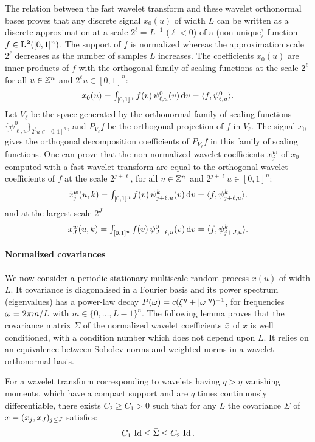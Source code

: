 \documentclass{article}
\begin{document}
The relation between the fast wavelet transform and these wavelet orthonormal
bases proves \cite{mallat1999wavelet} that any discrete signal $x_0 (u)$ of
width $L$ can be written as a discrete approximation at a scale $2^{\ell}=L^{-1}$ ($\ell < 0$) of a 
(non-unique) function $f \in {\bf L^2}([0,1]^n)$. The support of $f$ is normalized whereas the
approximation scale $2^\ell$ decreases as the number of samples $L$ increases. The coefficients $x_0(u)$ are inner
products of $f$ with the orthogonal family of scaling functions at the scale
$2^{\ell}$ for all $u \in \mathbb Z^n$ and $2^{\ell} u \in [0,1]^n$:
\[
  \textstyle{
    x_0 (u) = \int_{[0,1]^n} f(v)\, \psi^0_{\ell,u} (v) \, \mathrm{d}v = {\langle}f , \psi^0_{\ell,u}{\rangle}.
    }
\]
Let $V_{\ell}$ be the space generated by the orthonormal family of scaling functions
$\{ \psi^0_{\ell,u} \}_{2^{\ell} u \in [0,1]^n}$, and  $P_{V_{\ell}} f$ be
the orthogonal projection  of $f$ in $V_{\ell}$.
The signal $x_0$ gives the orthogonal 
decomposition coefficients of  $P_{V_{\ell}} f$ in this
family of scaling functions. One can prove \cite{mallat1999wavelet} that
the non-normalized wavelet coefficients ${\bar x}^w_j$ of $x_0$ computed with a fast
wavelet transform are equal to the orthogonal wavelet coefficients of $f$
at the scale $2^{j+\ell}$, for all $u \in \mathbb Z^n$ and $2^{j+\ell} u \in [0,1]^n$:
\[
  \textstyle{
    {\bar x}_j^w (u,k) = \int_{[0,1]^n} f(v)\, \psi^k_{j+\ell,u} (v) \, \mathrm{d}v = {\langle}f , \psi^k_{j+\ell,u}{\rangle}.
    }
\]
and at the largest scale $2^J$
\[
  \textstyle{
    x_J^w (u,k) = \int_{[0,1]^n} f(v)\, \psi^0_{J+\ell,u} (v) \, \mathrm{d}v = {\langle}f , \psi^k_{j+J,u}{\rangle}.
    }
\]
 

\paragraph{Normalized covariances}
We now consider a periodic stationary multiscale random process $x(u)$ of width $L$.
It covariance is diagonalised in a Fourier basis
and its power spectrum (eigenvalues) has a power-law decay
$P({\omega}) = c (\xi^\eta + |{\omega}|^\eta)^{-1}$, for frequencies ${\omega} = 2 \pi m / L$
with $m \in \{0, \dots, L-1\}^n$.  The following lemma proves that the covariance matrix
$\bar \Sigma$ of the normalized wavelet coefficients ${\bar x}$ of $x$ is well
conditioned, with a condition number which does not depend upon $L$. It relies on an equivalence between Sobolev norms and weighted norms in a wavelet orthonormal basis.

\begin{lemma}
  \label{sec:norm-covar}
  For a wavelet transform corresponding to wavelets having $q > \eta$ vanishing
  moments, which have a compact support and are $q$ times continuously differentiable, there exists
  $C_2 \geq C_1 > 0$ such that for any $L$ the covariance $\bar \Sigma$
  of $\bar x = ({\bar x}_j , x_J)_{j \leq J}$ satisfies:
\begin{equation}
    \label{stability}
  C_1\, \operatorname{Id} \leq \bar \Sigma \leq C_2 \,\operatorname{Id} .
\end{equation}
\end{lemma}
\end{document}
